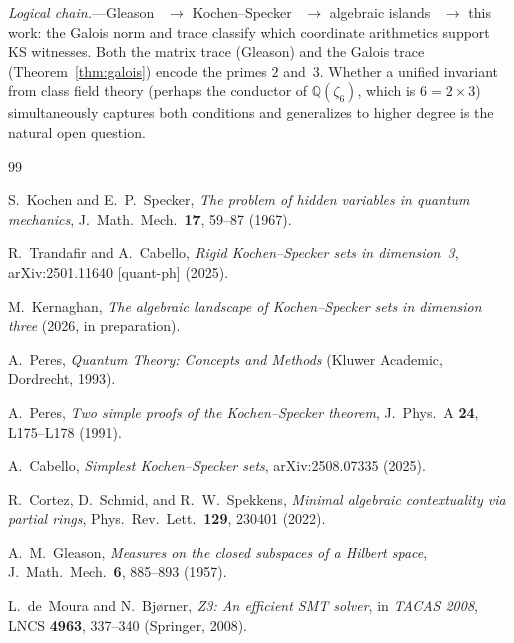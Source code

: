 \documentclass[12pt,a4paper]{article}
\newcommand{\Q}{\mathbb{Q}}
\begin{document}
\textit{Logical chain.}---Gleason~\cite{Gleason1957} $\to$
Kochen--Specker~\cite{KochenSpecker1967} $\to$
algebraic islands~\cite{Kernaghan2026islands} $\to$ this work: the
Galois norm and trace classify which coordinate arithmetics support
KS witnesses.  Both the matrix trace (Gleason) and the Galois trace
(Theorem~\ref{thm:galois}) encode the primes $2$ and~$3$.  Whether a
unified invariant from class field theory (perhaps the conductor of
$\Q(\zeta_6)$, which is $6 = 2 \times 3$) simultaneously captures
both conditions and generalizes to higher degree is the natural open
question.

\begin{thebibliography}{99}

S.~Kochen and E.~P.~Specker,
\textit{The problem of hidden variables in quantum mechanics},
J.~Math.\ Mech.\ \textbf{17}, 59--87 (1967).

R.~Trandafir and A.~Cabello,
\textit{Rigid Kochen--Specker sets in dimension~3},
arXiv:2501.11640 [quant-ph] (2025).

M.~Kernaghan,
\textit{The algebraic landscape of Kochen--Specker sets in dimension
three} (2026, in preparation).

A.~Peres,
\textit{Quantum Theory: Concepts and Methods}
(Kluwer Academic, Dordrecht, 1993).

A.~Peres,
\textit{Two simple proofs of the Kochen--Specker theorem},
J.~Phys.~A \textbf{24}, L175--L178 (1991).

A.~Cabello,
\textit{Simplest Kochen--Specker sets},
arXiv:2508.07335 (2025).

R.~Cortez, D.~Schmid, and R.~W.~Spekkens,
\textit{Minimal algebraic contextuality via partial rings},
Phys.~Rev.~Lett.\ \textbf{129}, 230401 (2022).

A.~M.~Gleason,
\textit{Measures on the closed subspaces of a Hilbert space},
J.~Math.\ Mech.\ \textbf{6}, 885--893 (1957).

L.~de~Moura and N.~Bj{\o}rner,
\textit{Z3: An efficient SMT solver},
in \textit{TACAS 2008}, LNCS \textbf{4963}, 337--340 (Springer, 2008).

\end{thebibliography}
\end{document}
